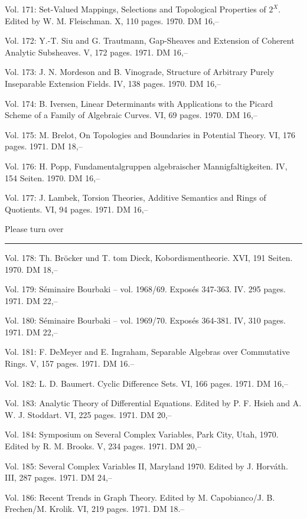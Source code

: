 Vol. 171: Set-Valued Mappings, Selections and Topological Properties of $2^X$. Edited by W. M. Fleischman. X, 110 pages. 1970. DM 16,--

Vol. 172: Y.-T. Siu and G. Trautmann, Gap-Sheaves and Extension of Coherent Analytic Subsheaves. V, 172 pages. 1971. DM 16,--

Vol. 173: J. N. Mordeson and B. Vinograde, Structure of Arbitrary Purely Inseparable Extension Fields. IV, 138 pages. 1970. DM 16,--

Vol. 174: B. Iversen, Linear Determinants with Applications to the Picard Scheme of a Family of Algebraic Curves. VI, 69 pages. 1970. DM 16,--

Vol. 175: M. Brelot, On Topologies and Boundaries in Potential Theory. VI, 176 pages. 1971. DM 18,--

Vol. 176: H. Popp, Fundamentalgruppen algebraischer Mannigfaltigkeiten. IV, 154 Seiten. 1970. DM 16,--

Vol. 177: J. Lambek, Torsion Theories, Additive Semantics and Rings of Quotients. VI, 94 pages. 1971. DM 16,--

Please turn over



\noindent\rule{\linewidth}{0.4pt}

Vol. 178: Th. Bröcker und T. tom Dieck, Kobordismentheorie. XVI, 191 Seiten. 1970. DM 18,--

Vol. 179: Séminaire Bourbaki -- vol. 1968/69. Exposés 347-363. IV. 295 pages. 1971. DM 22,--

Vol. 180: Séminaire Bourbaki -- vol. 1969/70. Exposés 364-381. IV, 310 pages. 1971. DM 22,--

Vol. 181: F. DeMeyer and E. Ingraham, Separable Algebras over Commutative Rings. V, 157 pages. 1971. DM 16.--

Vol. 182: L. D. Baumert. Cyclic Difference Sets. VI, 166 pages. 1971. DM 16,--

Vol. 183: Analytic Theory of Differential Equations. Edited by P. F. Hsieh and A. W. J. Stoddart. VI, 225 pages. 1971. DM 20,--

Vol. 184: Symposium on Several Complex Variables, Park City, Utah, 1970. Edited by R. M. Brooks. V, 234 pages. 1971. DM 20,--

Vol. 185: Several Complex Variables II, Maryland 1970. Edited by J. Horváth. III, 287 pages. 1971. DM 24,--

Vol. 186: Recent Trends in Graph Theory. Edited by M. Capobianco/J. B. Frechen/M. Krolik. VI, 219 pages. 1971. DM 18.--


